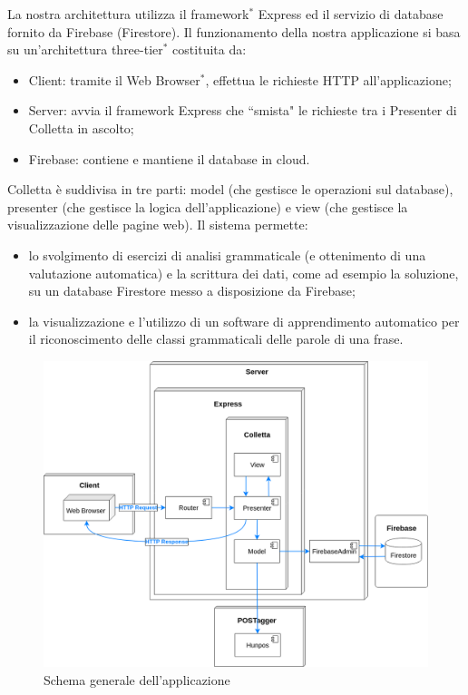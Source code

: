 La nostra architettura utilizza il framework$^{*}$ Express ed il servizio di database fornito da Firebase (Firestore). Il funzionamento della nostra applicazione si basa su un'architettura three-tier$^{*}$ costituita da:
\begin{itemize}
	\item Client: tramite il Web Browser$^*$, effettua le richieste HTTP all'applicazione;
	\item Server: avvia il framework Express che ``smista" le richieste tra i Presenter di Colletta in ascolto;
	\item Firebase: contiene e mantiene il database in cloud.
\end{itemize}

Colletta è suddivisa in tre parti: model (che gestisce le operazioni sul database), presenter (che gestisce la logica dell'applicazione) e view (che gestisce la visualizzazione delle pagine web). Il sistema permette:
\begin{itemize}
	\item lo svolgimento di esercizi di analisi grammaticale (e ottenimento di una valutazione automatica) e la scrittura dei dati, come ad esempio la soluzione, su un database Firestore messo a disposizione da Firebase;
	\item la visualizzazione e l'utilizzo di un software di apprendimento automatico per il riconoscimento delle classi grammaticali delle parole di una frase.
\end{itemize}

\begin{figure}[h]
	\includegraphics[scale=0.4]{images/architettura.png}
	\caption{Schema generale dell'applicazione}
\end{figure}

